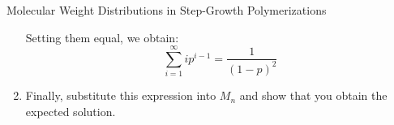 \begin{activity}{Molecular Weight Distributions in Step-Growth Polymerizations}
\begin{exercises}
\begin{enumerate}
\begin{solution}
{						Setting them equal, we obtain:
						\begin{equation*}
							\sum_{i=1}^{\infty} ip^{i-1} = \frac{1}{(1-p)^2}
						\end{equation*}
						
					}\end{solution}
					
				\item Finally, substitute this expression into $M_n$ and show that you obtain the expected solution.
				
				
					\begin{solution}\end{solution}
				
			\end{enumerate}
			
\end{exercises}
	
\end{activity}